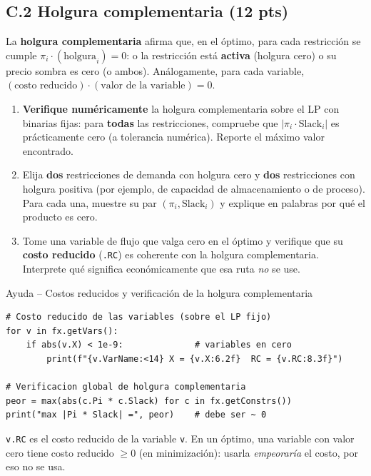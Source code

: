 \documentclass[12pt,a4paper]{article}
\begin{document}
\subsection*{C.2 \quad Holgura complementaria \hfill\normalfont\normalsize(12 pts)}

La \textbf{holgura complementaria} afirma que, en el óptimo, para cada restricción
se cumple $\pi_i \cdot (\text{holgura}_i)=0$: o la restricción está \textbf{activa}
(holgura cero) o su precio sombra es cero (o ambos). Análogamente, para cada
variable, $(\text{costo reducido})\cdot(\text{valor de la variable})=0$.

\begin{enumerate}[label=\alph*), leftmargin=*, topsep=2pt]
    \item \textbf{Verifique numéricamente} la holgura complementaria sobre el LP
          con binarias fijas: para \textbf{todas} las restricciones, compruebe que
          $|\pi_i \cdot \text{Slack}_i|$ es prácticamente cero (a tolerancia
          numérica). Reporte el máximo valor encontrado.
    \item Elija \textbf{dos} restricciones de demanda con holgura cero y
          \textbf{dos} restricciones con holgura positiva (por ejemplo, de
          capacidad de almacenamiento o de proceso). Para cada una, muestre su par
          $(\pi_i,\text{Slack}_i)$ y explique en palabras por qué el producto es
          cero.
    \item Tome una variable de flujo que valga cero en el óptimo y verifique que
          su \textbf{costo reducido} (\texttt{.RC}) es coherente con la holgura
          complementaria. Interprete qué significa económicamente que esa ruta
          \emph{no} se use.
\end{enumerate}

\begin{ayuda}{Ayuda -- Costos reducidos y verificación de la holgura complementaria}
\begin{lstlisting}
# Costo reducido de las variables (sobre el LP fijo)
for v in fx.getVars():
    if abs(v.X) < 1e-9:              # variables en cero
        print(f"{v.VarName:<14} X = {v.X:6.2f}  RC = {v.RC:8.3f}")

# Verificacion global de holgura complementaria
peor = max(abs(c.Pi * c.Slack) for c in fx.getConstrs())
print("max |Pi * Slack| =", peor)    # debe ser ~ 0
\end{lstlisting}
\texttt{v.RC} es el costo reducido de la variable \texttt{v}. En un óptimo, una
variable con valor cero tiene costo reducido $\ge 0$ (en minimización): usarla
\emph{empeoraría} el costo, por eso no se usa.
\end{ayuda}
\end{document}
